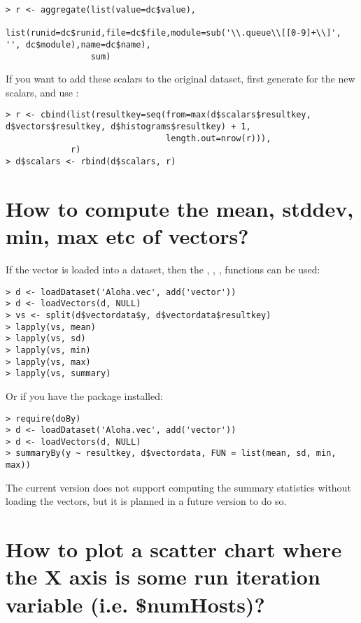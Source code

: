 \begin{verbatim}
> r <- aggregate(list(value=dc$value),
                 list(runid=dc$runid,file=dc$file,module=sub('\\.queue\\[[0-9]+\\]', '', dc$module),name=dc$name),
                 sum)
\end{verbatim}

If you want to add these scalars to the original dataset, first generate  for the new scalars,
and use :

\begin{verbatim}
> r <- cbind(list(resultkey=seq(from=max(d$scalars$resultkey, d$vectors$resultkey, d$histograms$resultkey) + 1,
                                length.out=nrow(r))),
             r)
> d$scalars <- rbind(d$scalars, r)
\end{verbatim}

\section{How to compute the mean, stddev, min, max etc of vectors?}

If the vector is loaded into a dataset, then the , , , 
functions can be used:

\begin{verbatim}
> d <- loadDataset('Aloha.vec', add('vector'))
> d <- loadVectors(d, NULL)
> vs <- split(d$vectordata$y, d$vectordata$resultkey)
> lapply(vs, mean)
> lapply(vs, sd)
> lapply(vs, min)
> lapply(vs, max)
> lapply(vs, summary)
\end{verbatim}

Or if you have the  package installed:

\begin{verbatim}
> require(doBy)
> d <- loadDataset('Aloha.vec', add('vector'))
> d <- loadVectors(d, NULL)
> summaryBy(y ~ resultkey, d$vectordata, FUN = list(mean, sd, min, max))
\end{verbatim}

The current version does not support computing the summary statistics without loading the vectors,
but it is planned in a future version to do so.

\section{How to plot a scatter chart where the X axis is some run iteration
variable (i.e. \$numHosts)?}

